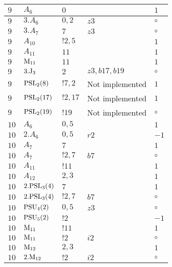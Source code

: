 \documentclass[a4paper, 11pt]{article}
\begin{document}
\begin{longtable}{lllll}
        $ 9 $ & $ A_{6} $ & $ 0 $ & $ ~ $ & $ 1$ \\ \hline
        $ 9 $ & $ 3.A_{6} $ & $ 0, 2 $ & $ z3 $ &  $\circ$ \\ \hline
        $ 9 $ & $ 3.A_{7} $ & $ 7 $ & $ z3 $ &  $\circ$ \\ \hline
        $ 9 $ & $ A_{10} $ & $ ! 2,5 $ & $ ~ $ & $ 1$ \\ \hline
        $ 9 $ & $ A_{11} $ & $ 11 $ & $ ~ $ & $ 1$ \\ \hline
        $ 9 $ & $ {\rm M}_{11} $ & $ 11 $ & $ ~ $ & $ 1$ \\ \hline
        $ 9 $ & $ 3.{\rm J}_3 $ & $ 2 $ & $ z3, b17, b19 $ &  $\circ$ \\ \hline
        $ 9 $ & $ {\rm PSL}_{2}(8) $ & $ !7, 2 $ &  Not implemented & $ 1$ \\ \hline
        $ 9 $ & $ {\rm PSL}_{2}(17) $ & $ !2, 17 $ &  Not implemented & $ 1$ \\ \hline
        $ 9 $ & $ {\rm PSL}_{2}(19) $ & $ !19 $ &  Not implemented &  $\circ$ \\ \hline
        $ 10 $ & $ A_{6} $ & $ 0,5 $ & $ ~ $ & $ 1$ \\ \hline
        $ 10 $ & $ 2.A_{6} $ & $ 0,5 $ & $ r2 $ & $ -1$ \\ \hline
        $ 10 $ & $ A_{7} $ & $ 7 $ & $ ~ $ & $ 1$ \\ \hline
        $ 10 $ & $ A_{7} $ & $ ! 2,7 $ & $ b7 $ &  $\circ$ \\ \hline
        $ 10 $ & $ A_{11} $ & $ ! 11 $ & $ ~ $ & $ 1$ \\ \hline
        $ 10 $ & $ A_{12} $ & $ 2,3 $ & $ ~ $ & $ 1$ \\ \hline
        $ 10 $ & $ 2.{\rm PSL}_{3}(4) $ & $ 7 $ & $ ~ $ & $ 1$ \\ \hline
        $ 10 $ & $ 2.{\rm PSL}_{3}(4) $ & $ ! 2,7 $ & $ b7 $ &  $\circ$ \\ \hline
        $ 10 $ & $ {\rm PSU}_{4}(2) $ & $ 0,5 $ & $ z3 $ &  $\circ$ \\ \hline
        $ 10 $ & $ {\rm PSU}_{5}(2) $ & $ ! 2 $ & $ ~ $ & $ -1$ \\ \hline
        $ 10 $ & $ {\rm M}_{11} $ & $ ! 11 $ & $ ~ $ & $ 1$ \\ \hline
        $ 10 $ & $ {\rm M}_{11} $ & $ ! 2 $ & $ i2 $ &  $\circ$ \\ \hline
        $ 10 $ & $ {\rm M}_{12} $ & $ 2, 3 $ & $ ~ $ & $ 1$ \\ \hline
        $ 10 $ & $ 2.{\rm M}_{12} $ & $ ! 2 $ & $ i2 $ &  $\circ$ \\ \hline

\end{longtable}
\end{document}
